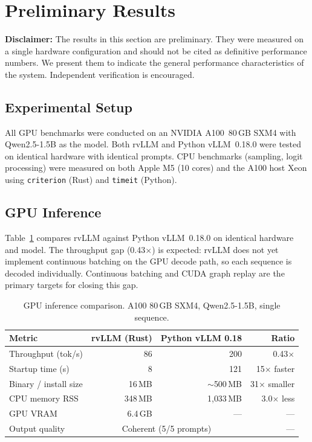 \documentclass[11pt,a4paper]{article}
\newcommand{\thead}[1]{\textbf{\color{white}#1}}
\begin{document}
\section{Preliminary Results}
\label{sec:results}

\textbf{Disclaimer:} The results in this section are preliminary. They were measured
on a single hardware configuration and should not be cited as definitive performance
numbers. We present them to indicate the general performance characteristics of the
system. Independent verification is encouraged.

\subsection{Experimental Setup}

All GPU benchmarks were conducted on an NVIDIA A100~80\,GB SXM4 with
Qwen2.5-1.5B as the model. Both rvLLM and Python vLLM~0.18.0 were tested on
identical hardware with identical prompts. CPU benchmarks (sampling, logit processing)
were measured on both Apple M5 (10 cores) and the A100 host Xeon using
\texttt{criterion} (Rust) and \texttt{timeit} (Python).

\subsection{GPU Inference}

Table~\ref{tab:gpu_bench} compares rvLLM against Python vLLM~0.18.0 on identical
hardware and model. The throughput gap (0.43$\times$) is expected: rvLLM does not
yet implement continuous batching on the GPU decode path, so each sequence is decoded
individually. Continuous batching and CUDA graph replay are the primary targets for
closing this gap.

\begin{table}[t]
  \centering
  \caption{GPU inference comparison. A100 80\,GB SXM4, Qwen2.5-1.5B, single sequence.}
  \label{tab:gpu_bench}
  \small
  \begin{tabular}{@{}lrrr@{}}
    \toprule
    \rowcolor{HeaderBlue} \thead{Metric} & \thead{rvLLM (Rust)} & \thead{Python vLLM 0.18} & \thead{Ratio} \\
    \midrule
    Throughput (tok/s)       & 86            & 200           & 0.43$\times$ \\
    \rowcolor{gray!8}
    Startup time (s)         & 8             & 121           & 15$\times$ faster \\
    Binary / install size    & 16\,MB        & $\sim$500\,MB & 31$\times$ smaller \\
    \rowcolor{gray!8}
    CPU memory RSS           & 348\,MB       & 1{,}033\,MB   & 3.0$\times$ less \\
    GPU VRAM                 & 6.4\,GB       & ---           & --- \\
    \rowcolor{gray!8}
    Output quality           & \multicolumn{2}{c}{Coherent (5/5 prompts)} & --- \\
    \bottomrule
  \end{tabular}
\end{table}
\end{document}
